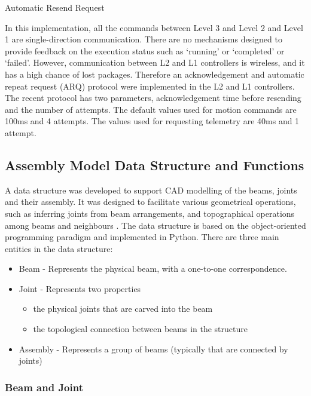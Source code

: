 Automatic Resend Request

In this implementation, all the commands between Level 3 and Level 2 and Level 1 are single-direction communication. There are no mechanisms designed to provide feedback on the execution status such as ‘running’ or ‘completed’ or ‘failed’. However, communication between L2 and L1 controllers is wireless, and it has a high chance of lost packages. Therefore an acknowledgement and automatic repeat request (ARQ) protocol were implemented in the L2 and L1 controllers. The recent protocol has two parameters, acknowledgement time before resending and the number of attempts. The default values used for motion commands are 100ms and 4 attempts. The values used for requesting telemetry are 40ms and 1 attempt. 

\subsection{Assembly Model Data Structure and Functions}
\label{subsection:exploration-2-assembly-model-data-structure-and-functions}

A data structure was developed to support CAD modelling of the beams, joints and their assembly. It was designed to facilitate various geometrical operations, such as inferring joints from beam arrangements, and topographical operations among beams and neighbours . The data structure is based on the object-oriented programming paradigm and implemented in Python. 
There are three main entities in the data structure:
\begin{itemize}
    \item Beam - Represents the physical beam, with a one-to-one correspondence.
    \item Joint - Represents two properties 
    \begin{itemize}
        \item the physical joints that are carved into the beam
        \item the topological connection between beams in the structure
    \end{itemize}
    \item Assembly - Represents a group of beams (typically that are connected by joints)
\end{itemize}

\subsubsection{Beam and Joint}
\label{subsubsection:exploration-2-beam-and-joint}

